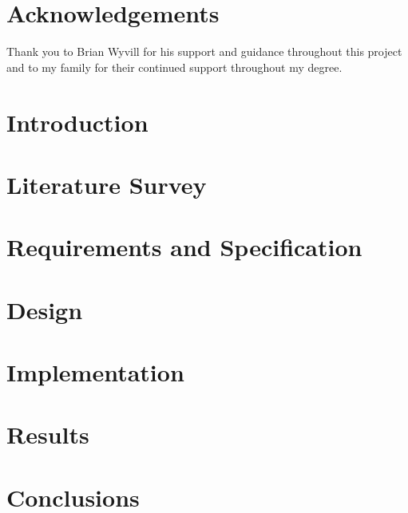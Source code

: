 
\maketitle
\newpage
\newpage


\declaration{\disstitle}{\authorname} %
\newpage


\abstract

\newpage


\tableofcontents
\newpage
\listoffigures
\newpage

\chapter*{Acknowledgements}
Thank you to Brian Wyvill for his support and guidance throughout this project and
to my family for their continued support throughout my degree.
\newpage

\listoftodos

\setcounter{page}{1}



\chapter{Introduction}

\chapter{Literature Survey}


\chapter{Requirements and Specification}


\chapter{Design}


\chapter{Implementation}


\chapter{Results}


\chapter{Conclusions}




\appendix




